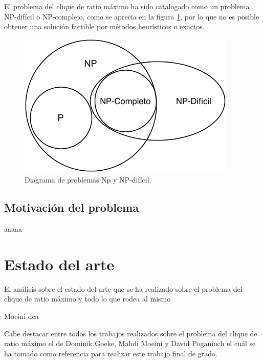 El problema del clique de ratio máximo ha sido catalogado como un problema NP-difícil o NP-complejo, como se aprecia en la figura \ref{fig:np-dificil}, por lo que no es posible obtener una solución factible por métodos heurísticos o exactos.

\begin{figure}[H]
	\centering
	\includegraphics{Figures/problemas-np-hard.pdf}
	\caption{Diagrama de problemas Np y NP-difícil.}
	\label{fig:np-dificil}
\end{figure}

\subsection{Motivación del problema}

aaaaa

\section{Estado del arte}
El análisis sobre el estado del arte que se ha realizado sobre el problema del clique de ratio máximo y todo lo que rodea al mismo 

Moeini dca

\cite{mrcp-ants}

\cite{mrcp-Sethuraman:2015}

Cabe destacar entre todos los trabajos realizados sobre el problema del clique de ratio máximo el de Dominik Goeke, Mahdi Moeini y David Poganiuch \cite{mrcp-GOEKE2017283} el cuál se ha tomado como referencia para realizar este trabajo final de grado.


